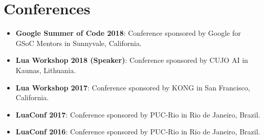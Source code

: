 \documentclass[letterpaper,11pt]{article}
\newcommand{\resumeSubHeadingListStart}{\begin{itemize}[leftmargin=*]}
\newcommand{\resumeSubHeadingListEnd}{\end{itemize}}
\begin{document}
\section{Conferences}
  \resumeSubHeadingListStart
    \item{
        \textbf{Google Summer of Code 2018}{: Conference sponsored by Google for GSoC Mentors in Sunnyvale, California.}
    }
    \item{
        \textbf{Lua Workshop 2018 (Speaker)}{: Conference sponsored by CUJO AI in Kaunas, Lithuania.}
    }
    \item{
        \textbf{Lua Workshop 2017}{: Conference sponsored by KONG in San Francisco, California.}
    }
    \item{
        \textbf{LuaConf 2017}{: Conference sponsored by PUC-Rio in Rio de Janeiro, Brazil.}
    }
    \item{
        \textbf{LuaConf 2016}{: Conference sponsored by PUC-Rio in Rio de Janeiro, Brazil.}
    }
  \resumeSubHeadingListEnd
\end{document}
